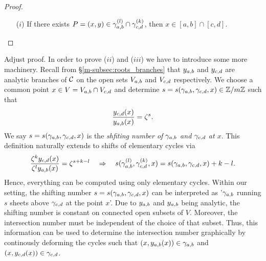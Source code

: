 \documentclass[main.tex]{subfiles}
\begin{document}
  \begin{proof}\let\qed\relax
   \begin{itemize}
    \item[($i$)] If there exists $P = (x,y) \in \gamma_{a,b}^{(l)} \cap \gamma_{c,d}^{(k)}$, then  $x \in [a,b] \cap [c,d]$.
   \end{itemize}
  \end{proof}
  \todo Adjust proof.
  In order to prove ($ii$) and ($iii$) we have to introduce some more machinery. Recall from \S \ref{m-subsec:roots_branches} that $y_{a,b}$ and $y_{c,d}$ are analytic branches of $\mathcal{C}$ on the open sets
  $V_{a,b}$ and $V_{c,d}$ respectively. \abstandl
  We choose a common point $x \in V = V_{a,b} \cap V_{c,d}$ and determine $s  = s(\gamma_{a,b},\gamma_{c,d},x) \in \mathbb{Z}/m\mathbb{Z}$  such that
  \begin{align}
   \frac{y_{c,d}(x)}{y_{a,b}(x)} = \zeta^s .
  \end{align}
  We say $s  = s(\gamma_{a,b},\gamma_{c,d},x)$ is the \emph{shfiting number of $\gamma_{a,b}$ and $\gamma_{c,d}$ at $x$}.
  This definition naturally extends to shifts of elementary cycles via
\begin{align}\label{eq:shift_numb_rel}
  \frac{\zeta^ky_{c,d}(x)}{\zeta^ly_{a,b}(x)} = \zeta^{s+k-l} \quad \Rightarrow \quad s(\gamma_{a,b}^{(l)},\gamma_{c,d}^{(k)},x) = s(\gamma_{a,b},\gamma_{c,d},x) + k - l.
\end{align}
 Hence, everything can be computed using only elementary cycles. \abstandl
 Within our setting, the shifting number $s=s(\gamma_{a,b},\gamma_{c,d},x)$  can be interpreted as '$\gamma_{a,b}$ running $s$ sheets above $\gamma_{c,d}$ at the point $x$'.
 Due to $y_{a,b}$ and $y_{a,b}$ being analytic, the shifting number is constant on connected open subsets of $V$. Moreover, the intersection number must be independent of the choice of that subset. \abstandl
 Thus,
 this information can be used to determine
 the intersection number graphically by continously deforming the cycles such that $(x,y_{a,b}(x)) \in \gamma_{a,b}$ and $(x,y_{c,d}(x)) \in \gamma_{c,d}$.
\end{document}
